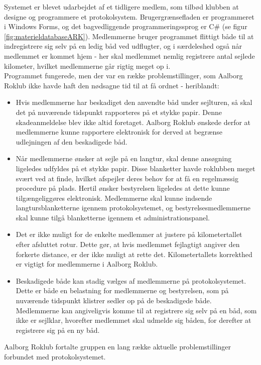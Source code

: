 Systemet er blevet udarbejdet af et tidligere medlem, som tilbød klubben at designe og programmere et protokolsystem. Brugergrænsefladen er programmeret i Windows Forms, og det bagvedliggende programmeringssprog er C\# (se figur \ref{fig:materieldatabaseARK}). Medlemmerne bruger programmet flittigt både til at indregistrere sig selv på en ledig båd ved udflugter, og i særdeleshed også når medlemmet er kommet hjem - her skal medlemmet nemlig registrere antal sejlede kilometer, hvilket medlemmerne går rigtig meget op i. \\
Programmet fungerede, men der var en række problemstillinger, som Aalborg Roklub ikke havde haft den nødsagne tid til at få ordnet - heriblandt:
\begin{itemize}
\item Hvis medlemmerne har beskadiget den anvendte båd under sejlturen, så skal det på nuværende tidspunkt rapporteres på et stykke papir. Denne skadeanmeldelse blev ikke altid foretaget. Aalborg Roklub ønskede derfor at medlemmerne kunne rapportere elektronisk for derved at begrænse udlejningen af den beskadigede båd.
\item Når medlemmerne ønsker at sejle på en langtur, skal denne ansøgning ligeledes udfyldes på et stykke papir. Disse blanketter havde roklubben meget svært ved at finde, hvilket afspejler deres behov for at få en regelmæssig procedure på plads. Hertil ønsker bestyrelsen ligeledes at dette kunne tilgængeliggøres elektronisk. Medlemmerne skal kunne indsende langtursblanketterne igennem protokolsystemet, og bestyrelsesmedlemmerne skal kunne tilgå blanketterne igennem et administrationspanel.
\item Det er ikke muligt for de enkelte medlemmer at justere på kilometertallet efter afsluttet rotur. Dette gør, at hvis medlemmet fejlagtigt angiver den forkerte distance, er der ikke muligt at rette det. Kilometertallets korrekthed er vigtigt for medlemmerne i Aalborg Roklub.
\item Beskadigede både kan stadig vælges af medlemmerne på protokolsystemet. Dette er både en belastning for medlemmerne og bestyrelsen, som på nuværende tidspunkt klistrer sedler op på de beskadigede både. Medlemmerne kan angiveligvis komme til at registrere sig selv på en båd, som ikke er sejlklar, hvorefter medlemmet skal udmelde sig båden, for derefter at registrere sig på en ny båd.
\end{itemize}

Aalborg Roklub fortalte gruppen en lang række aktuelle problemstillinger forbundet med protokolsystemet.


